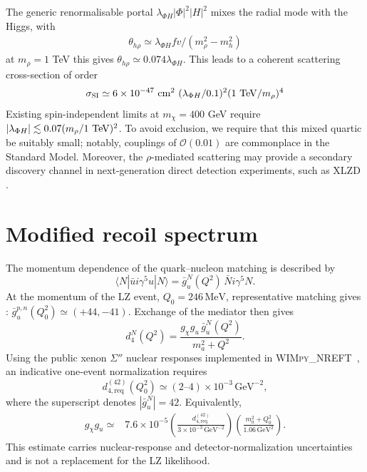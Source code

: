 \documentclass[notitlepage,floats,aps,nofootinbib,preprintnumbers,twocolumn,prl,10pt,balancelastpage]{revtex4-1}
\def\beq{\begin{equation}\begin{aligned}}
\def\eeq{\end{aligned}\end{equation}}
\begin{document}
The generic renormalisable portal $\lambda_{\Phi H}|\Phi|^2|H|^2$ mixes the radial mode with
the Higgs, with 
\beq
\theta_{h\rho}\simeq\lambda_{\Phi H}fv/(m_\rho^2-m_h^2)
\eeq at $m_\rho=1$ TeV this gives $\theta_{h\rho}\simeq0.074\lambda_{\Phi H}$. This leads to a coherent scattering cross-section of order 
\beq
\sigma_{\rm SI}\simeq6\times10^{-47}~{\rm cm}^2~(\lambda_{\Phi H}/0.1)^2(1~{\rm TeV}/m_\rho)^4
\eeq
Existing spin-independent limits \cite{LZ:2024zvo} at $m_\chi=400$ GeV require $|\lambda_{\Phi H}|\lesssim0.07(m_\rho/1~{\rm TeV})^2$.  To avoid exclusion, we require that this mixed quartic be suitably small; notably, couplings of $\mathcal{O}(0.01)$ are commonplace in the Standard Model. 
%
Moreover, the $\rho$-mediated scattering may provide a secondary discovery channel in next-generation direct detection experiments, such as XLZD \cite{XLZD:2024nsu}.


\vspace{-2mm}
\section{Modified recoil spectrum}
\vspace{-1mm}

The momentum dependence of the quark--nucleon matching is described by
\begin{equation}
 \langle N|\bar u i\gamma^5u|N\rangle
 =\bar g_u^N(Q^2)\,\bar N i\gamma^5N .
 \label{eq:formfactor-def}
\end{equation}
At the momentum of the LZ event, $Q_0=246\,\mathrm{MeV}$, representative
matching gives \cite{Bishara:2017pfq}:
$ \bar g_u^{p,n}(Q_0^2)\simeq(+44,-41)$.
Exchange of the mediator then gives
\begin{equation}
 d_4^N(Q^2)=
 \frac{g_\chi g_u\,\bar g_u^N(Q^2)}{m_a^2+Q^2}.
 \label{eq:d4matching}
\end{equation}
Using the public xenon $\Sigma''$ nuclear responses implemented in
\textsc{WIMpy\_NREFT}~\cite{Anand:2013yka}, an indicative one-event
normalization requires
\[
 d_{4,\mathrm{req}}^{(42)}(Q_0^2)
 \simeq(2\text{--}4)\times10^{-3}\,\mathrm{GeV}^{-2},
\]
where the superscript denotes $|\bar g_u^N|=42$.  Equivalently,
\begin{align}
 g_\chi g_u\simeq{}&7.6\times10^{-5}
 \left(\frac{d_{4,\mathrm{req}}^{(42)}}
 {3\times10^{-3}\,\mathrm{GeV}^{-2}}\right)
 \left(\frac{m_a^2+Q_0^2}{1.06\,\mathrm{GeV}^2}\right).
 \label{eq:LZnorm}
\end{align}
This estimate carries nuclear-response and detector-normalization
uncertainties and is not a replacement for the LZ likelihood.
\end{document}
